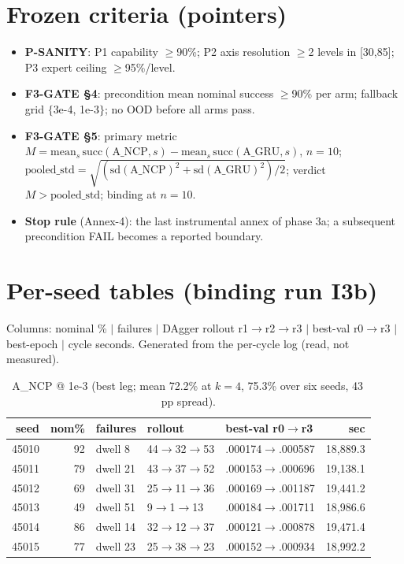 \documentclass[11pt]{article}
\begin{document}
\section{Frozen criteria (pointers)}
\begin{itemize}
  \item \textbf{P-SANITY}: P1 capability $\geq$90\%; P2 axis resolution $\geq$2 levels in [30,85]; P3 expert ceiling $\geq$95\%/level.
  \item \textbf{F3-GATE \S4}: precondition mean nominal success $\geq$90\% per arm; fallback grid $\{$3e-4, 1e-3$\}$; no OOD before all arms pass.
  \item \textbf{F3-GATE \S5}: primary metric $M = \text{mean}_s\,\text{succ}(\text{A\_NCP},s) - \text{mean}_s\,\text{succ}(\text{A\_GRU},s)$, $n{=}10$; $\text{pooled\_std} = \sqrt{(\text{sd}(\text{A\_NCP})^2 + \text{sd}(\text{A\_GRU})^2)/2}$; verdict $M > \text{pooled\_std}$; binding at $n{=}10$.
  \item \textbf{Stop rule} (Annex-4): the last instrumental annex of phase 3a; a subsequent precondition FAIL becomes a reported boundary.
\end{itemize}

\section{Per-seed tables (binding run I3b)}\label{app:perseed}
Columns: nominal \% $\mid$ failures $\mid$ DAgger rollout r1$\to$r2$\to$r3 $\mid$ best-val r0$\to$r3 $\mid$ best-epoch $\mid$ cycle seconds. Generated from the per-cycle log (read, not measured).

\begin{table}[h]
\centering\small
\caption{A\_NCP @ 1e-3 (best leg; mean 72.2\% at $k{=}4$, 75.3\% over six seeds, 43\,pp spread).}
\begin{tabular}{rrlllr}
\toprule
seed & nom\% & failures & rollout & best-val r0$\to$r3 & sec \\
\midrule
45010 & 92 & dwell 8 & 44$\to$32$\to$53 & .000174$\to$.000587 & 18{,}889.3 \\
45011 & 79 & dwell 21 & 43$\to$37$\to$52 & .000153$\to$.000696 & 19{,}138.1 \\
45012 & 69 & dwell 31 & 25$\to$11$\to$36 & .000169$\to$.001187 & 19{,}441.2 \\
45013 & 49 & dwell 51 & 9$\to$1$\to$13 & .000184$\to$.001711 & 18{,}986.6 \\
45014 & 86 & dwell 14 & 32$\to$12$\to$37 & .000121$\to$.000878 & 19{,}471.4 \\
45015 & 77 & dwell 23 & 25$\to$38$\to$23 & .000152$\to$.000934 & 18{,}992.2 \\
\bottomrule
\end{tabular}
\end{table}
\end{document}
